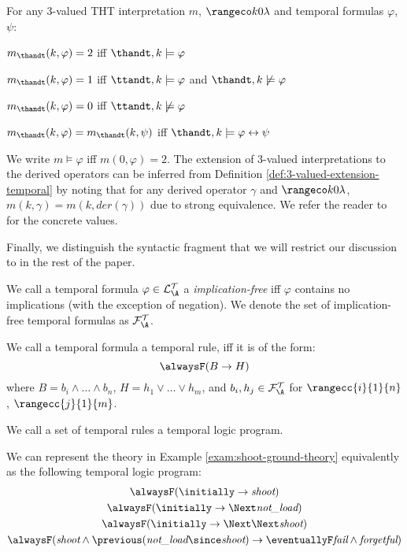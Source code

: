 \begin{proposition}\label{prop:3-valued-temporal-properties}
  For any 3-valued THT interpretation $m$, $\kinlambda$ and temporal
  formulas $\varphi$, $\psi$:
\begin{description}
\item $m_{\thandt}(k,\varphi) = 2$ iff $\thandt,k \models \varphi$
\item $m_{\thandt}(k,\varphi) = 1$ iff $\ttandt,k \models \varphi$ and $\thandt,k \not\models \varphi$
  \item $m_{\thandt}(k,\varphi) = 0$ iff $\ttandt,k \not\models \varphi$
\item $m_{\thandt}(k,\varphi) = m_{\thandt}(k,\psi)$ iff $\thandt,k \models \varphi \leftrightarrow \psi$
\end{description}
\end{proposition}

We write $m \models \varphi$ iff $m(0,\varphi)=2$. The extension of
3-valued interpretations to the derived operators can be inferred from
Definition \ref{def:3-valued-extension-temporal} by noting that for
any derived operator $\gamma$ and $\kinlambda$,
$m(k,\gamma)=m(k,der(\gamma))$ due to strong equivalence. We refer the
reader to \cite{agcadipescscvi20a} for the concrete values.

Finally, we distinguish the syntactic fragment that we will restrict
our discussion to in the rest of the paper.

\begin{definition}
  We call a temporal formula $\varphi \in \langat$ a
  \emph{implication-free} iff $\varphi$ contains no implications (with
  the exception of negation). We denote the set of implication-free
  temporal formulas as $\langfat$.
  
  We call a temporal formula a temporal rule, iff it is of the form:
  $$
  \tempruleshort
  $$
  where $B=b_i \land \dots \land b_n$, $H=h_1 \lor \dots \lor h_m$,
  and $b_i,h_j \in \langfat$ for $\rangecc{i}{1}{n}$,
  $\rangecc{j}{1}{m}$.  

  We call a set of temporal rules a temporal logic program.
\end{definition}

\begin{example}\label{exam:shoot-ground-program}
  We can represent the theory in Example
  \ref{exam:shoot-ground-theory} equivalently as the following
  temporal logic program:
\begin{equation*}
\begin{gathered}
\alwaysF (\initially \rightarrow \textit{shoot})\\
\alwaysF (\initially \rightarrow \Next\textit{not\_load})\\
\alwaysF (\initially \rightarrow \Next\Next\textit{shoot})\\
\alwaysF(\textit{shoot} \wedge \previous(\textit{not\_load} \since \textit{shoot})
\rightarrow \eventuallyF \textit{fail} \wedge \textit{forgetful})
\end{gathered}
\end{equation*}
\end{example}
